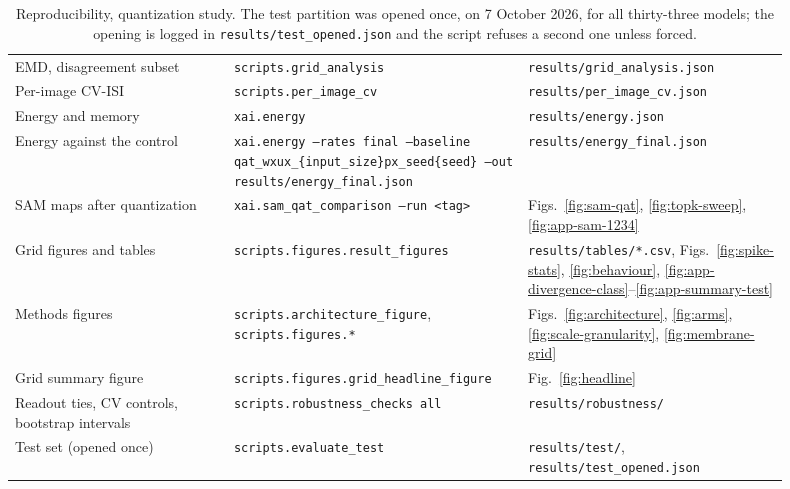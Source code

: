 \begin{table}[htbp]
\begin{tabular}{>{\raggedright\arraybackslash}p{0.26\linewidth}>{\raggedright\arraybackslash}p{0.33\linewidth}>{\raggedright\arraybackslash}p{0.31\linewidth}}
EMD, disagreement subset & \texttt{scripts.grid\_analysis} & \texttt{results/grid\_analysis.json} \\
Per-image CV-ISI & \texttt{scripts.per\_image\_cv} & \texttt{results/per\_image\_cv.json} \\
Energy and memory & \texttt{xai.energy} & \texttt{results/energy.json} \\
Energy against the control & \texttt{xai.energy --rates final --baseline
  qat\_wxux\_\{input\_size\}px\_seed\{seed\} --out results/energy\_final.json} &
  \texttt{results/energy\_final.json} \\
SAM maps after quantization & \texttt{xai.sam\_qat\_comparison --run <tag>} &
  Figs.~\ref{fig:sam-qat}, \ref{fig:topk-sweep}, \ref{fig:app-sam-1234} \\
Grid figures and tables & \texttt{scripts.figures.result\_figures} &
  \texttt{results/tables/*.csv}, Figs.~\ref{fig:spike-stats}, \ref{fig:behaviour}, \ref{fig:app-divergence-class}--\ref{fig:app-summary-test} \\
Methods figures & \texttt{scripts.architecture\_figure}, \texttt{scripts.figures.*} &
  Figs.~\ref{fig:architecture}, \ref{fig:arms}, \ref{fig:scale-granularity}, \ref{fig:membrane-grid} \\
Grid summary figure & \texttt{scripts.figures.grid\_headline\_figure} & Fig.~\ref{fig:headline} \\
Readout ties, CV controls, bootstrap intervals & \texttt{scripts.robustness\_checks all} & \texttt{results/robustness/} \\
Test set (opened once) & \texttt{scripts.evaluate\_test} &
  \texttt{results/test/}, \texttt{results/test\_opened.json} \\
\bottomrule
\end{tabular}
\caption{Reproducibility, quantization study. The test partition was opened
once, on 7 October 2026, for all thirty-three models; the opening is logged in
\texttt{results/test\_opened.json} and the script refuses a second one unless
forced.}
\label{tab:repro-b}
\end{table}
